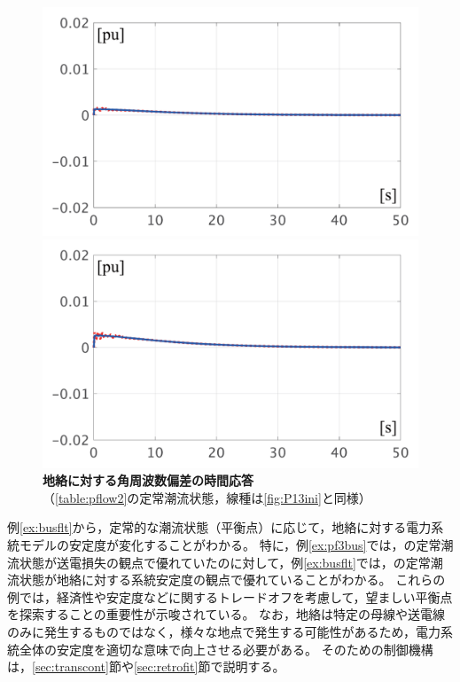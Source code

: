 \documentclass[tombow,dvipdfmx]{corona-a5-1.1}
\begin{document}
\begin{figure}[t]
  \centering
  {
  \begin{minipage}{0.49\linewidth}
    \centering
    \includegraphics[width = 1.0\linewidth]{figs/50mP3}
  \end{minipage}
  \begin{minipage}{0.49\linewidth}
    \centering
    \includegraphics[width = 1.0\linewidth]{figs/100mP3}
  \end{minipage}
  \medskip
  \caption{\textbf{地絡に対する角周波数偏差の時間応答}
  \\ \centering （\ref{table:pflow2}の定常潮流状態，線種は\ref{fig:P13ini}と同様）}
  \label{fig:P3fault}
  }
\medskip
\end{figure}

例\ref{ex:busflt}から，定常的な潮流状態（平衡点）に応じて，地絡に対する電力系統モデルの安定度が変化することがわかる。
特に，例\ref{ex:pf3bus}では，の定常潮流状態が送電損失の観点で優れていたのに対して，例\ref{ex:busflt}では，の定常潮流状態が地絡に対する系統安定度の観点で優れていることがわかる。
これらの例では，経済性や安定度などに関するトレードオフを考慮して，望ましい平衡点を探索することの重要性が示唆されている。
なお，地絡は特定の母線や送電線のみに発生するものではなく，様々な地点で発生する可能性があるため，電力系統全体の安定度を適切な意味で向上させる必要がある。
そのための制御機構は，\ref{sec:transcont}節や\ref{sec:retrofit}節で説明する。
\end{document}
